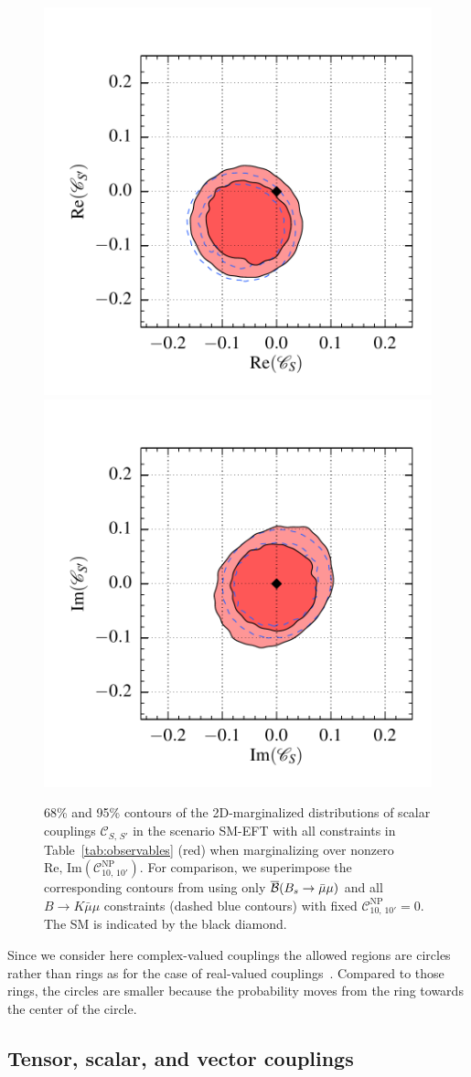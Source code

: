\documentclass[twocolumn,epjc3]{svjour3}
\numberwithin{equation}{section}
\def \reftab#1{Table~\ref{#1}}
\newcommand{\checked}[1]{{\color{brown}{ {\bf Checked: }{#1}}}}
\renewcommand{\checked}[1]{#1}
\newcommand{\wilson}[2][{}]{\mathcal{C}_{#2}^{\mathrm{#1}}}
\renewcommand{\[}{\big[}
\renewcommand{\]}{\big]}
\renewcommand{\(}{\big(}
\renewcommand{\)}{\big)}
\begin{document}
\begin{figure}
  \begin{center}
      \includegraphics[width=.35\textwidth]{plots/pdf/smEFTS_K_Bsmumu,smEFTS10_K_KstarBR_Bsmumu_0,2}
      \includegraphics[width=.35\textwidth]{plots/pdf/smEFTS_K_Bsmumu,smEFTS10_K_KstarBR_Bsmumu_1,3}
    \end{center}
    \caption{ 68\% and 95\% contours of the 2D-marginalized distributions of
      scalar couplings $\wilson{S,\,S'}$ in the scenario SM-EFT with all
      constraints in \reftab{tab:observables} (red) when marginalizing over
      nonzero $\mbox{Re, Im} (\wilson[NP]{10,\,10'})$.  For comparison, we
      superimpose the corresponding contours from using only $\overline{\cal
        B}(B_s\to \bar\mu\mu)$ and all {$B \to K \bar\mu\mu$} constraints
      (dashed blue contours) with fixed $\wilson[NP]{10,\,10'} = 0$.  The SM is
      indicated by the black diamond.  \checked{}}
  \label{fig:scalar:SM-EFT}
\end{figure}

Since we consider here complex-valued couplings the allowed regions are circles
rather than rings as for the case of real-valued
couplings~\cite{Alonso:2014csa}. Compared to those rings, the circles are
smaller because the probability moves from the ring towards the center of the
circle.

%
%
\subsection{Tensor, scalar, and vector couplings \label{sec:tensor:scalar}}
\end{document}
